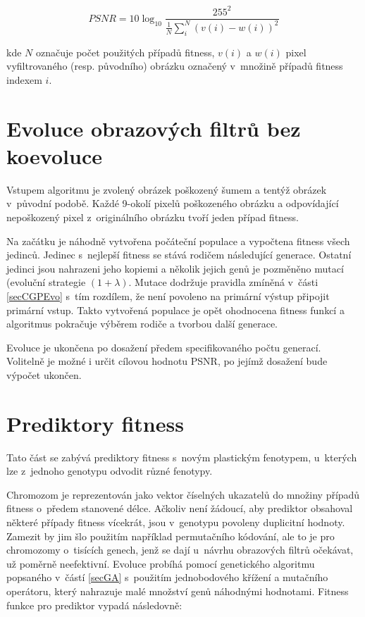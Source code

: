 \begin{equation}
    \label{eqDesignPSNR}
    \mathit{PSNR} = 10 \log_{10} \frac{255^2}{\frac{1}{N} \sum\limits_i^N \left( v\left( i \right) - w\left( i \right)  \right)^2 }
\end{equation}

\noindent{}kde $N$ označuje počet použitých případů fitness, $v(i)$ a $w(i)$ pixel vyfiltrovaného (resp. původního) obrázku označený v~množině případů fitness indexem $i$.

\section{Evoluce obrazových filtrů bez koevoluce}
\label{secDesignEvoSimple}

Vstupem algoritmu je zvolený obrázek poškozený šumem a tentýž obrázek v~původní podobě. Každé 9-okolí pixelů poškozeného obrázku a odpovídající nepoškozený pixel z~originálního obrázku tvoří jeden případ fitness.

Na začátku je náhodně vytvořena počáteční populace a vypočtena fitness všech jedinců. Jedinec s~nejlepší fitness se stává rodičem následující generace. Ostatní jedinci jsou nahrazeni jeho kopiemi a několik jejich genů je pozměněno mutací (evoluční strategie $(1 + \lambda)$. Mutace dodržuje pravidla zmíněná v~části \ref{secCGPEvo} s~tím rozdílem, že není povoleno na primární výstup připojit primární vstup. Takto vytvořená populace je opět ohodnocena fitness funkcí a algoritmus pokračuje výběrem rodiče a tvorbou další generace.

Evoluce je ukončena po dosažení předem specifikovaného počtu generací. Volitelně je možné i určit cílovou hodnotu PSNR, po jejímž dosažení bude výpočet ukončen.

\section{Prediktory fitness}
\label{secDesignPred}

Tato část se zabývá prediktory fitness s~novým plastickým fenotypem, u~kterých lze z~jednoho genotypu  odvodit různé fenotypy.

Chromozom je reprezentován jako vektor číselných ukazatelů do množiny případů fitness o~předem stanovené délce. Ačkoliv není žádoucí, aby prediktor obsahoval některé případy fitness vícekrát, jsou v~genotypu povoleny duplicitní hodnoty. Zamezit by jim šlo použitím například permutačního kódování, ale to je pro chromozomy o~tisících genech, jenž se dají u~návrhu obrazových filtrů očekávat, už poměrně neefektivní. Evoluce probíhá pomocí genetického algoritmu popsaného v~částí \ref{secGA} s~použitím jednobodového křížení a mutačního operátoru, který nahrazuje malé množství genů náhodnými hodnotami. Fitness funkce pro prediktor vypadá následovně:

